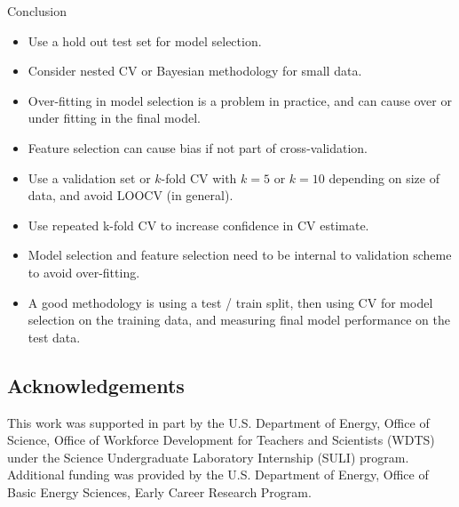 \documentclass[onecolumn,abstract,paper=letter]{scrartcl}
\begin{document}
\begin{section}{Conclusion}


\begin{itemize}
    \item Use a hold out test set for model selection.
    \item Consider nested CV or Bayesian methodology for small data.
    \item Over-fitting in model selection is a problem in practice, and can cause over or under fitting in the final model.
    \item Feature selection can cause bias if not part of cross-validation.
\end{itemize}

\begin{itemize}
    \item Use a validation set or $k$-fold CV with $k=5$ or $k=10$ depending on size of data, and avoid LOOCV (in general).
    \item Use repeated k-fold CV to increase confidence in CV estimate.
    \item Model selection and feature selection need to be internal to validation scheme to avoid over-fitting.
    \item A good methodology is using a test / train split, then using CV for model selection on the training data, and measuring final model performance on the test data.
\end{itemize}



\end{section}


\subsection*{Acknowledgements}
{\small 
This work was supported in part by the U.S. Department of Energy, Office of Science, Office of Workforce Development for Teachers and Scientists (WDTS) under the Science Undergraduate Laboratory Internship (SULI) program.
Additional funding was provided by the U.S. Department of Energy, Office of Basic Energy Sciences, Early Career Research Program.
}

\scriptsize
\nocite{*}


\end{document}
